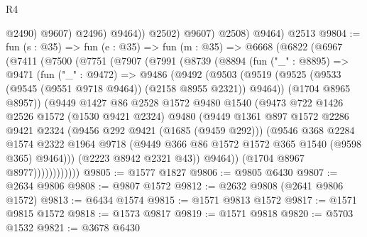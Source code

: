 \begin{lexlean}{R4}
\begin{coremodule}
                      @2490)
                    @9607)
                  @2496)
                @9464))
            @2502)
          @9607)
        @2508)
      @9464)
    @2513
@9804 := fun (s : @35) =>
  fun (e : @35) =>
  fun (m : @35) =>
  @6668
    (@6822
      (@6967
        (@7411
          (@7500
            (@7751
              (@7907
                (@7991
                  (@8739
                    (@8894
                      (fun ("_" : @8895) =>
                      @9471
                        (fun ("_" : @9472) =>
                        @9486
                          (@9492
                            (@9503
                              (@9519
                                (@9525
                                  (@9533 (@9545 (@9551 @9718 @9464)) (@2158 @8955 @2321))
                                  @9464))
                              (@1704 @8965 @8957))
                            (@9449
                              @1427
                              @86
                              @2528
                              @1572
                              @9480
                              @1540
                              (@9473
                                @722
                                @1426
                                @2526
                                @1572
                                (@1530 @9421 @2324)
                                @9480
                                (@9449
                                  @1361
                                  @897
                                  @1572
                                  @2286
                                  @9421
                                  @2324
                                  (@9456 @292 @9421 (@1685 (@9459 @292)))
                                  (@9546
                                    @368
                                    @2284
                                    @1574
                                    @2322
                                    @1964
                                    @9718
                                    (@9449 @366 @86 @1572 @1572 @365 @1540 (@9598 @365) @9464)))
                                (@2223 @8942 @2321 @43))
                              @9464))
                          (@1704 @8967 @8977))))))))))))
@9805 := @1577 @1827
@9806 := @9805 @6430
@9807 := @2634 @9806
@9808 := @9807 @1572
@9812 := @2632 @9808 (@2641 @9806 @1572)
@9813 := @6434 @1574
@9815 := @1571 @9813 @1572
@9817 := @1571 @9815 @1572
@9818 := @1573 @9817
@9819 := @1571 @9818
@9820 := @5703 @1532
@9821 := @3678 @6430

\end{coremodule}
\end{lexlean}
